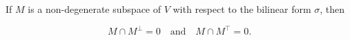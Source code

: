 If $M$ is a non-degenerate subspace of $V$ with respect to the bilinear form $\sigma$, then

$$M \cap M^{\perp} = 0 \quad \text{and} \quad M \cap M^{\top} = 0.$$
